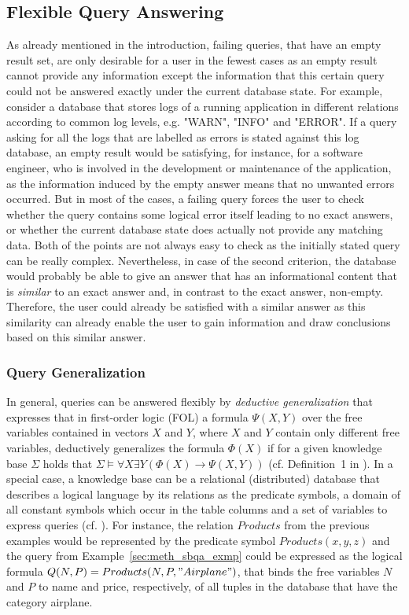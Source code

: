 \subsection{Flexible Query Answering}
\label{sec:meth_fqa}

As already mentioned in the introduction, failing queries, that have an empty result set, are only desirable for a user in the fewest cases as an empty
result cannot provide any information except the information that this certain query could not be answered exactly under the current database state. For
example, consider a database that stores logs of a running application in different relations according to common log levels, e.g. "WARN", "INFO" and
"ERROR". If a query asking for all the logs that are labelled as errors is stated against this log database, an empty result would be satisfying, for 
instance, for a software engineer, who is involved in the development or maintenance of the application, as the information induced by the empty answer 
means that no unwanted errors occurred. But in most of the cases, a failing query forces the user to check whether the query contains some logical error
itself leading to no exact answers, or whether the current database state does actually not provide any matching data. Both of the points are not always
easy to check as the initially stated query can be really complex. Nevertheless, in case of the second criterion, the database would probably be able to
give an answer that has an informational content that is \emph{similar} to an exact answer and, in contrast to the exact answer, non-empty. Therefore, the
user could already be satisfied with a similar answer as this similarity can already enable the user to gain information and draw conclusions based on this
similar answer.

\subsubsection{Query Generalization}
\label{sec:meth_fqa_qgen}
In general, queries can be answered flexibly by \emph{deductive generalization} \citep{Gaasterland1992, Wiese2014} that expresses that in first-order logic
(FOL) a formula $\Psi(X,Y)$ over the free variables contained in vectors $X$ and $Y$, where $X$ and $Y$ contain only different free variables, deductively
generalizes the formula $\Phi(X)$ if for a given knowledge base $\Sigma$ holds that $\Sigma \vDash \forall X \exists Y (\Phi(X) \to \Psi(X,Y))$ 
(cf. Definition~1 in \cite{Wiese2014}). In a special case, a knowledge base can be a relational (distributed) database that describes a logical language by
its relations as the predicate symbols, a domain of all constant symbols which occur in the table columns and a set of variables to express queries 
(cf. \cite{Wiese2014}). For instance, the relation $Products$ from the previous examples would be represented by the predicate symbol $Products(x,y,z)$
and the query from Example~\ref{sec:meth_sbqa_exmp} could be expressed as the logical formula $Q(N,P)=Products(N,P,"Airplane")$, that binds the free 
variables $N$ and $P$ to name and price, respectively, of all tuples in the database that have the category airplane. 

